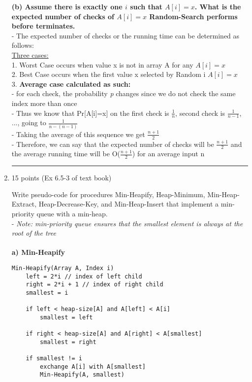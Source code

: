 \documentclass[letterpaper,12pt]{article}
\begin{document}
\begin{enumerate}
\textbf{(b) Assume there is exactly one $i$ such that $A[i]=x$. What is the expected number
of checks of $A[i]=x$ Random-Search performs before terminates.} \\
- The expected number of checks or the running time can be determined as follows: \\
\underline{Three cases:} \\
1. Worst Case occurs when value x is not in array A for any \(A[i]=x\) \\
2. Best Case occurs when the first value x selected by Random i \(A[i]=x\) \\
3. \textbf{Average case calculated as such: }\\
- for each check, the probability \textit{p} changes since we do not check the same index more than once \\
- Thus we know that Pr[A[i]=x] on the first check is \(\frac{1}{n}\), second check is \(\frac{1}{n-1}\), ..., going to \(\frac{1}{n-(n-1)}\) \\
- Taking the average of this sequence we get \(\frac{n+1}{2}\) \\
- Therefore, we can say that the expected number of checks will be \(\frac{n+1}{2}\) and the average running time will be O(\(\frac{n+1}{2}\)) for an average input n
\\ \noindent\rule{16cm}{0.1pt}
 
\item 15 points (Ex 6.5-3 of text book)

Write pseudo-code for procedures Min-Heapify, Heap-Minimum, Min-Heap-Extract, 
Heap-Decrease-Key, and Min-Heap-Insert that implement a min-priority queue with a 
min-heap. \\
- \textit{Note: min-priority queue ensures that the smallest element is always at the root of the tree} \\ \\
\textbf{a) Min-Heapify}
\begin{verbatim}
Min-Heapify(Array A, Index i)
    left = 2*i // index of left child
    right = 2*i + 1 // index of right child
    smallest = i
    
    if left < heap-size[A] and A[left] < A[i]
        smallest = left
    
    if right < heap-size[A] and A[right] < A[smallest]
        smallest = right
    
    if smallest != i
        exchange A[i] with A[smallest]
        Min-Heapify(A, smallest)
\end{verbatim}


\end{enumerate}
\end{document}
